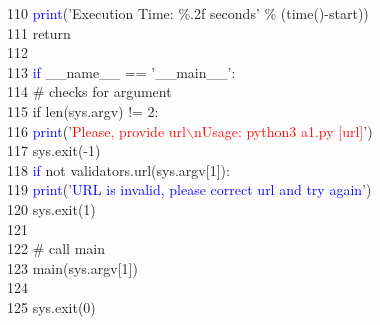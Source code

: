 110	 \hspace*{5mm}    \hspace*{5mm}\textcolor{blue}{print}('Execution Time: \%.2f seconds' \% (time()-start))\\
111	 \hspace*{5mm}    \hspace*{5mm}return\\
112	 \hspace*{5mm}\\
113	 \hspace*{5mm}\textcolor{blue}{if} \_\_name\_\_ == '\_\_main\_\_':\\
114	 \hspace*{5mm}    \hspace*{5mm}\# checks for argument\\
115	 \hspace*{5mm}    \hspace*{5mm}if len(sys.argv) $!$= 2:\\
116	 \hspace*{5mm}        \hspace*{10mm}\textcolor{blue}{print}('\textcolor{red}{Please, provide url$\backslash$nUsage: python3 a1.py [url]}')\\
117	 \hspace*{5mm}        \hspace*{10mm}sys.exit(-1)\\
118	 \hspace*{5mm}    \hspace*{5mm}\textcolor{blue}{if} not validators.url(sys.argv[1]):\\
119	 \hspace*{5mm}        \hspace*{10mm}\textcolor{blue}{print}('\textcolor{blue}{URL is invalid, please correct url and try again}')\\
120	 \hspace*{5mm}        \hspace*{10mm}sys.exit(1)\\
121	 \hspace*{5mm}\\
122	 \hspace*{5mm}    \hspace*{5mm}\# call main\\
123	 \hspace*{5mm}    \hspace*{5mm}main(sys.argv[1])\\
124	 \hspace*{5mm}\\
125	 \hspace*{5mm}    \hspace*{5mm}sys.exit(0)\\
